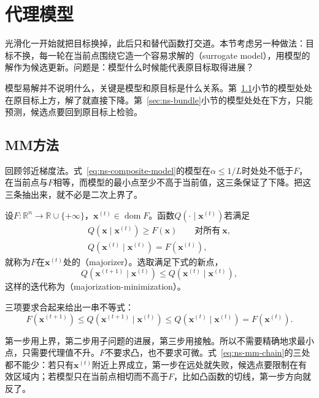 \section{代理模型}
\label{sec:ns-surrogate}

光滑化一开始就把目标换掉，此后只和替代函数打交道。本节考虑另一种做法：目标不换，每一轮在当前点围绕它造一个容易求解的（surrogate model），用模型的解作为候选更新。问题是：模型什么时候能代表原目标取得进展？

模型易解并不说明什么，关键是模型和原目标是什么关系。第~\ref{sec:ns-mm}小节的模型处处在原目标上方，解了就直接下降。第~\ref{sec:ns-bundle}小节的模型处处在下方，只能预测，候选点要回到原目标上检验。

\subsection{MM方法}
\label{sec:ns-mm}

回顾邻近梯度法。式~\eqref{eq:ns-composite-model}的模型在$\alpha\leq1/L$时处处不低于$F$，在当前点与$F$相等，而模型的最小点至少不高于当前值，这三条保证了下降。把这三条抽出来，就不必是二次上界了。

\begin{definition}[上界代理与MM更新]
\label{def:ns-mm}
设$F:\mathbb{R}^n\to\mathbb{R}\cup\{+\infty\}$，$\bm{x}^{(t)}\in\operatorname{dom}F$。函数$Q(\cdot\mid\bm{x}^{(t)})$若满足
\begin{gather}
 Q(\bm{x}\mid\bm{x}^{(t)})\geq F(\bm{x})\qquad\text{对所有}\ \bm{x},\label{eq:ns-mm-majorize}\\
 Q(\bm{x}^{(t)}\mid\bm{x}^{(t)})=F(\bm{x}^{(t)}),\label{eq:ns-mm-touch}
\end{gather}
就称为$F$在$\bm{x}^{(t)}$处的（majorizer）。选取满足下式的新点，
\begin{equation}
 Q(\bm{x}^{(t+1)}\mid\bm{x}^{(t)})\leq Q(\bm{x}^{(t)}\mid\bm{x}^{(t)}),
 \label{eq:ns-mm-progress}
\end{equation}
这样的迭代称为（majorization-minimization）。
\end{definition}

三项要求合起来给出一串不等式：
\begin{equation}
 F(\bm{x}^{(t+1)})\leq Q(\bm{x}^{(t+1)}\mid\bm{x}^{(t)})\leq Q(\bm{x}^{(t)}\mid\bm{x}^{(t)})=F(\bm{x}^{(t)}).
 \label{eq:ns-mm-chain}
\end{equation}

第一步用上界，第二步用子问题的进展，第三步用接触。所以不需要精确地求最小点，只需要代理值不升。$F$不要求凸，也不要求可微。式~\eqref{eq:ns-mm-chain}的三处都不能少：若只有$\bm{x}^{(t)}$附近上界成立，第一步在远处就失败，候选点要限制在有效区域内；若模型只在当前点相切而不高于$F$，比如凸函数的切线，第一步方向就反了。

